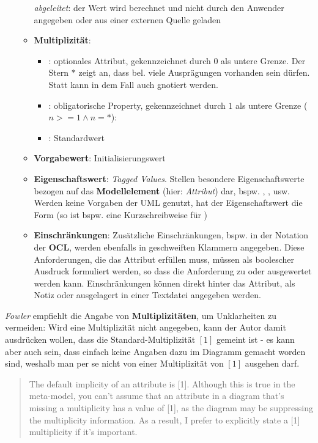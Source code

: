 \begin{itemize}
\begin{itemize}
{            \textit{abgeleitet}: der Wert wird berechnet und nicht durch den Anwender angegeben oder aus einer externen Quelle geladen
        }
        \item \textbf{Multiplizität}:
        \begin{itemize}
            \item \code{[0..*]}: optionales Attribut, gekennzeichnet durch $0$ als untere Grenze.
            Der Stern $*$ zeigt an, dass bel. viele Ausprägungen vorhanden sein dürfen.
            Statt \code{[0..*]} kann in dem Fall auch \code{[*]} gnotiert werden.
            \item \code{[1..n]}: obligatorische Property, gekennzeichnet durch $1$ als untere Grenze ($n >= 1 \land n=*$):
            \item \code{[1]}: Standardwert
        \end{itemize}
        \item \textbf{Vorgabewert}: Initialisierungswert
        \item \textbf{Eigenschaftswert}: \textit{Tagged Values}.
        Stellen besondere Eigenschaftswerte bezogen auf das \textbf{Modellelement} (hier: \textit{Attribut}) dar, {bspw.} , ,  usw. Werden keine Vorgaben der UML genutzt, hat der Eigenschaftswert die Form  (so ist bspw.  eine Kurzschreibweise für  )
        \item \textbf{Einschränkungen}: Zusätzliche Einschränkungen, bspw. in der Notation der \textbf{OCL}, werden ebenfalls in geschweiften Klammern angegeben.
        Diese Anforderungen, die das Attribut erfüllen muss, müssen als boolescher Ausdruck formuliert werden, so dass die Anforderung zu  oder  ausgewertet werden kann.
        Einschränkungen können direkt hinter das Attribut, als Notiz oder ausgelagert in einer Textdatei angegeben werden.
    \end{itemize}

\end{itemize}

\vspace{2mm}
\begin{tcolorbox}[title=Fehlende Angaben zur Multiplizität]
    \textit{Fowler} empfiehlt die Angabe von \textbf{Multiplizitäten}, um Unklarheiten zu vermeiden: Wird eine Multiplizität nicht angegeben, kann der Autor damit ausdrücken wollen, dass die Standard-Multiplizität $[1]$ gemeint ist - es kann aber auch sein, dass einfach keine Angaben dazu im Diagramm gemacht worden sind, weshalb man per se nicht von einer Multiplizität von $[1]$ ausgehen darf.
    \blockquote[{\cite[39]{Fow03b}}]{
        The default implicity of an attribute is [1]. Although this is true in the meta-model, you can't assume that an attribute in a diagram that's missing a multiplicity has a value of [1], as the diagram may be suppressing the multiplicity information. As a result, I prefer to explicitly state a [1] multiplicity if it's important.
    }
\end{tcolorbox}
\vspace{2mm}


